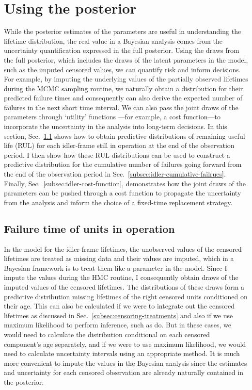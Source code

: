 \section{Using the posterior} \label{sec:idler-frames-using-posterior}

While the posterior estimates of the parameters are useful in understanding the lifetime distribution, the real value in a Bayesian analysis comes from the uncertainty quantification expressed in the full posterior. Using the draws from the full posterior, which includes the draws of the latent parameters in the model, such as the imputed censored values, we can quantify risk and inform decisions. For example, by imputing the underlying values of the partially observed lifetimes during the MCMC sampling routine, we naturally obtain a distribution for their predicted failure times and consequently can also derive the expected number of failures in the next short time interval. We can also pass the joint draws of the parameters through `utility' functions \citep[Chap.~9]{BDA2020}---for example, a cost function---to incorporate the uncertainty in the analysis into long-term decisions. In this section, Sec.~\ref{subsec:idler-FTs} shows how to obtain predictive distributions of remaining useful life (RUL) for each idler-frame still in operation at the end of the observation period. I then show how these RUL distributions can be used to construct a predictive distribution for the cumulative number of failures going forward from the end of the observation period in Sec.~\ref{subsec:idler-cumulative-failrues}. Finally, Sec.~\ref{subsec:idler-cost-function}, demonstrates how the joint draws of the parameters can be pushed through a cost function to propagate the uncertainty from the analysis and inform the choice of a fixed-time replacement strategy.

\subsection{Failure time of units in operation} \label{subsec:idler-FTs}

In the model for the idler-frame lifetimes, the unobserved values of the censored lifetimes are treated as missing data and their values are imputed, which in a Bayesian framework is to treat them like a parameter in the model. Since I impute the values during the HMC routine, I consequently obtain draws of the imputed values of the censored lifetimes. The distributions of these draws form a predictive distribution missing lifetimes of the right censored units conditioned on their age. This can also be calculated if we were to integrate out the censored lifetimes as discussed in Sec.~\ref{subsec:censoring-treatments} and also if we use maximum likelihood to perform inference, such as \citet{hong2009} do. But in these cases, we would need to calculate the distribution conditional on each censored component's age separately, and if we were to use maximum likelihood, we would need to calculate uncertainty intervals using an appropriate method. It is much more convenient to impute the values in the Bayesian analysis since the estimates and uncertainty for each censored observation are already naturally contained in the posterior.

